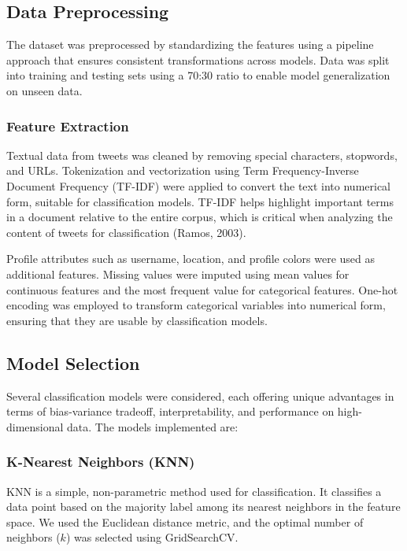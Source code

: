 \documentclass[a4paper,11pt]{article}
\begin{document}
\subsection{Data Preprocessing}

The dataset was preprocessed by standardizing the features using a pipeline approach that ensures consistent transformations across models. Data was split into training and testing sets using a 70:30 ratio to enable model generalization on unseen data.

\subsubsection{Feature Extraction}

Textual data from tweets was cleaned by removing special characters, stopwords, and URLs. Tokenization and vectorization using Term Frequency-Inverse Document Frequency (TF-IDF) were applied to convert the text into numerical form, suitable for classification models. TF-IDF helps highlight important terms in a document relative to the entire corpus, which is critical when analyzing the content of tweets for classification (Ramos, 2003).

Profile attributes such as username, location, and profile colors were used as additional features. Missing values were imputed using mean values for continuous features and the most frequent value for categorical features. One-hot encoding was employed to transform categorical variables into numerical form, ensuring that they are usable by classification models.

\subsection{Model Selection}

Several classification models were considered, each offering unique advantages in terms of bias-variance tradeoff, interpretability, and performance on high-dimensional data. The models implemented are:

\subsubsection{K-Nearest Neighbors (KNN)}

KNN is a simple, non-parametric method used for classification. It classifies a data point based on the majority label among its nearest neighbors in the feature space. We used the Euclidean distance metric, and the optimal number of neighbors ($k$) was selected using GridSearchCV.
\end{document}
